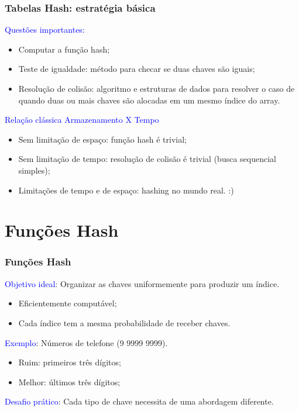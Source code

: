 \documentclass{beamer}
\newcommand{\tcb}[1]{\textcolor{blue}{#1}}
\begin{document}
\begin{frame}
  \frametitle{Tabelas Hash: estratégia básica}

  \tcb{Questões importantes:}
  \begin{itemize}
    \item Computar a função hash;
    \item Teste de igualdade: método para checar se duas chaves são iguais;
    \item Resolução de colisão: algoritmo e estruturas de dados para resolver o caso de quando duas ou mais chaves são alocadas em um mesmo índice do array.
  \end{itemize}
  
  \tcb{Relação clássica Armazenamento X Tempo}
  \begin{itemize}
    \item Sem limitação de espaço: função hash é trivial;
    \item Sem limitação de tempo: resolução de colisão é trivial (busca sequencial simples);
    \item Limitações de tempo e de espaço: hashing no mundo real. :)
  \end{itemize}
\end{frame}

\section{Funções Hash}

\begin{frame}
  \frametitle{Funções Hash}

  \tcb{Objetivo ideal}: Organizar as chaves uniformemente para produzir um índice.
  \begin{itemize}
    \item Eficientemente computável;
    \item Cada índice tem a mesma probabilidade de receber chaves.
  \end{itemize}

  \tcb{Exemplo}: Números de telefone (9 9999 9999).
  \begin{itemize}
    \item Ruim: primeiros três dígitos;
    \item Melhor: últimos três dígitos;
  \end{itemize}

  \tcb{Desafio prático}: Cada tipo de chave necessita de uma abordagem diferente.
\end{frame}
\end{document}
